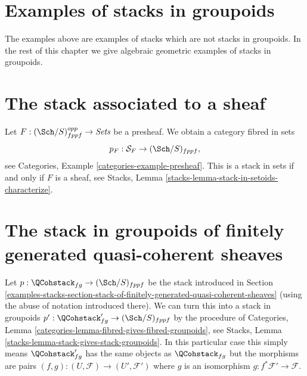 \section{Examples of stacks in groupoids}
\label{examples-stacks-section-examples-stacks-in-groupoids}
The examples above are examples of stacks which are not stacks in
groupoids. In the rest of this chapter we give
algebraic geometric examples of stacks in groupoids.

\section{The stack associated to a sheaf}
\label{examples-stacks-section-stack-associated-to-sheaf}
Let $F : (\Sch/S)_{fppf}^{opp} \to \textit{Sets}$ be a presheaf.
We obtain a category fibred in sets
$$
p_F : \mathcal{S}_F \to (\Sch/S)_{fppf},
$$
see
Categories, Example \ref{categories-example-presheaf}.
This is a stack in sets if and only if $F$ is a sheaf, see
Stacks, Lemma \ref{stacks-lemma-stack-in-setoids-characterize}.

\section{The stack in groupoids of finitely generated quasi-coherent sheaves}
\label{examples-stacks-section-stack-in-groupoids-of-quasi-coherent-sheaves}
Let $p : \QCohstack_{fg} \to (\Sch/S)_{fppf}$ be the stack
introduced in
Section \ref{examples-stacks-section-stack-of-finitely-generated-quasi-coherent-sheaves}
(using the abuse of notation introduced there).
We can turn this into a stack in groupoids
$p' : \QCohstack_{fg}' \to (\Sch/S)_{fppf}$ by
the procedure of
Categories, Lemma \ref{categories-lemma-fibred-gives-fibred-groupoids},
see
Stacks, Lemma \ref{stacks-lemma-stack-gives-stack-groupoids}.
In this particular case this simply means $\QCohstack_{fg}'$ has
the same objects as $\QCohstack_{fg}$ but the morphisms are
pairs $(f, g) : (U, \mathcal{F}) \to (U', \mathcal{F}')$
where $g$ is an isomorphism $g : f^*\mathcal{F}' \to \mathcal{F}$.


